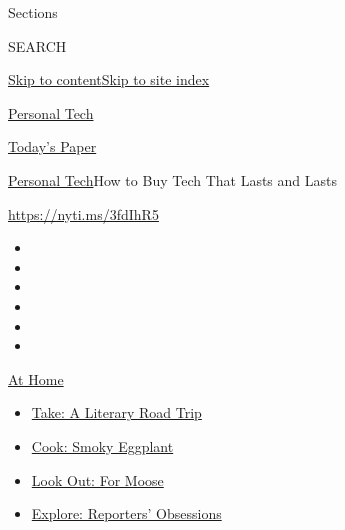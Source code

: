 Sections

SEARCH

\protect\hyperlink{site-content}{Skip to
content}\protect\hyperlink{site-index}{Skip to site index}

\href{https://www.nytimes3xbfgragh.onion/section/technology/personaltech}{Personal
Tech}

\href{https://myaccount.nytimes3xbfgragh.onion/auth/login?response_type=cookie\&client_id=vi}{}

\href{https://www.nytimes3xbfgragh.onion/section/todayspaper}{Today's
Paper}

\href{/section/technology/personaltech}{Personal Tech}\textbar{}How to
Buy Tech That Lasts and Lasts

\url{https://nyti.ms/3fdIhR5}

\begin{itemize}
\item
\item
\item
\item
\item
\item
\end{itemize}

\href{https://www.nytimes3xbfgragh.onion/spotlight/at-home?action=click\&pgtype=Article\&state=default\&region=TOP_BANNER\&context=at_home_menu}{At
Home}

\begin{itemize}
\tightlist
\item
  \href{https://www.nytimes3xbfgragh.onion/2020/07/28/books/time-for-a-literary-road-trip.html?action=click\&pgtype=Article\&state=default\&region=TOP_BANNER\&context=at_home_menu}{Take:
  A Literary Road Trip}
\item
  \href{https://www.nytimes3xbfgragh.onion/2020/07/29/magazine/bored-with-your-home-cooking-some-smoky-eggplant-will-fix-that.html?action=click\&pgtype=Article\&state=default\&region=TOP_BANNER\&context=at_home_menu}{Cook:
  Smoky Eggplant}
\item
  \href{https://www.nytimes3xbfgragh.onion/2020/07/27/travel/moose-michigan-isle-royale.html?action=click\&pgtype=Article\&state=default\&region=TOP_BANNER\&context=at_home_menu}{Look
  Out: For Moose}
\item
  \href{https://www.nytimes3xbfgragh.onion/interactive/2020/at-home/even-more-reporters-editors-diaries-lists-recommendations.html?action=click\&pgtype=Article\&state=default\&region=TOP_BANNER\&context=at_home_menu}{Explore:
  Reporters' Obsessions}
\end{itemize}

